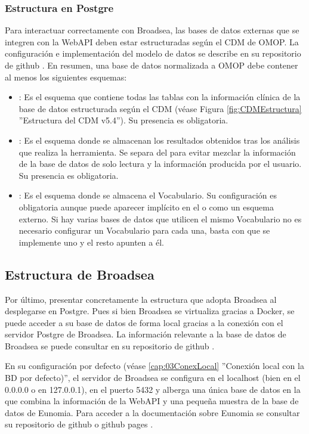 \subsubsection{Estructura en Postgre}

Para interactuar correctamente con Broadsea, las bases de datos externas que se integren con la WebAPI deben estar estructuradas según el CDM de OMOP. La configuración e implementación del modelo de datos se describe en su repositorio de github \parencite{githubCDMConfig}. En resumen, una base de datos normalizada a OMOP debe contener al menos los siguientes esquemas:

\begin{itemize}
    \item \textbf{}: Es el esquema que contiene todas las tablas con la información clínica de la base de datos estructurada según el CDM (véase Figura \ref{fig:CDMEstructura} ''Estructura del CDM v5.4''). Su presencia es obligatoria.
    \item \textbf{}: Es el esquema donde se almacenan los resultados obtenidos tras los análisis que realiza la herramienta. Se separa del  para evitar mezclar la información de la base de datos de solo lectura y la información producida por el usuario. Su presencia es obligatoria.
    \item \textbf{}: Es el esquema donde se almacena el Vocabulario. Su configuración es obligatoria aunque puede aparecer implícito en el  o como un esquema externo. Si hay varias bases de datos que utilicen el mismo Vocabulario no es necesario configurar un Vocabulario para cada una, basta con que se implemente uno y el resto apunten a él.
\end{itemize}

\subsection{Estructura de Broadsea} \label{subsec:01estructuraBroadsea}

Por último, presentar concretamente la estructura que adopta Broadsea al desplegarse en Postgre. Pues si bien Broadsea se virtualiza gracias a Docker, se puede acceder a su base de datos de forma local gracias a la conexión con el servidor Postgre de Broadsea. La información relevante a la base de datos de Broadsea se puede consultar en su repositorio de github \parencite{githubBroadseaDB}.

En su configuración por defecto (véase \ref{cap:03ConexLocal} ''Conexión local con la BD por defecto)'', el servidor de Broadsea se configura en el localhost (bien en el 0.0.0.0  o en 127.0.0.1), en el puerto 5432 \parencite{githubBroadseaDB} y alberga una única base de datos en la que combina la información de la WebAPI y una pequeña muestra de la base de datos de Eunomia. Para acceder a la documentación sobre Eunomia se consultar su repositorio de github \parencite{githubEunomia} o github pages \parencite{githubPagesEunomia}.

